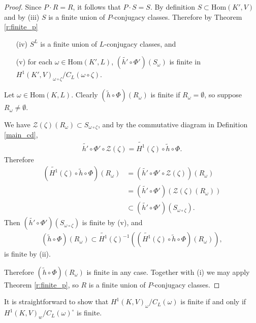 \begin{proof}
Since $P \cdot R = R$, it follows that $P\cdot S = S$. By definition $S \subset \mathrm{Hom}(K', V)$ and by (iii) $S$ is a finite union of $P$-conjugacy classes. Therefore by Theorem \ref{r:finite_p}
\begin{itemize}
	\item[(iv)] $S^L$ is a finite union of $L$-conjugacy classes, and
	\item[(v)] for each $\omega \in \mathrm{Hom}(K', L)$, $(\widetilde{h'} \circ \Phi')\left(S_\omega\right)$ is finite in $H^1(K', V)_{\omega\circ\zeta}/C_L(\omega\circ\zeta)$.
\end{itemize}

Let $\omega \in \mathrm{Hom}(K, L)$. Clearly $(\widetilde{h} \circ \Phi)\left(R_\omega\right)$ is finite if $R_\omega = \emptyset$, so suppose $R_\omega \neq \emptyset$. 

We have $\mathcal{Z}(\zeta)(R_\omega) \subset S_{\omega\circ\zeta}$, and by the commutative diagram in Definition \ref{main_cd},
\begin{align*}
	\widetilde{h'} \circ \Phi' \circ \mathcal{Z}(\zeta) = \widetilde{H^1}(\zeta) \circ \widetilde{h} \circ \Phi.
\end{align*}
Therefore
\begin{align*}
	\left(\widetilde{H^1}(\zeta) \circ \widetilde{h} \circ \Phi\right)(R_\omega) &= \left(\widetilde{h'} \circ \Phi' \circ \mathcal{Z}(\zeta)\right)(R_\omega) \\
		&= (\widetilde{h'} \circ \Phi')\left(\mathcal{Z}(\zeta)(R_\omega)\right) \\
		&\subset (\widetilde{h'} \circ \Phi')(S_{\omega\circ\zeta}).
\end{align*}
Then $\left(\widetilde{h'} \circ \Phi'\right)(S_{\omega\circ\zeta})$ is finite by (v), and
\begin{align*}
	(\widetilde{h} \circ \Phi)(R_\omega) \subset \widetilde{H^1}(\zeta)^{-1} \left(\left(\widetilde{H^1}(\zeta) \circ \widetilde{h} \circ \Phi\right)(R_\omega)\right),
\end{align*}
is finite by (ii).

Therefore $(\widetilde{h} \circ \Phi)(R_\omega)$ is finite in any case. Together with (i) we may apply Theorem \ref{r:finite_p}, so $R$ is a finite union of $P$-conjugacy classes.
\end{proof}

\begin{remark}
	It is straightforward to show that $H^1(K, V)_\omega/C_L(\omega)$ is finite if and only if $H^1(K, V)_w/C_L(\omega)^\circ$ is finite.
\end{remark}

